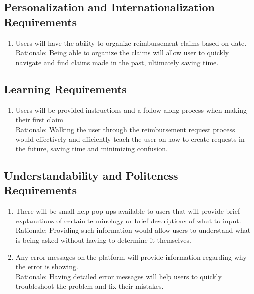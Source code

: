 \documentclass[12pt]{article}
\begin{document}
\subsection{Personalization and Internationalization Requirements}

\begin{enumerate}
  
  \item Users will have the ability to organize reimbursement claims based on date. \\
  Rationale: Being able to organize the claims will allow user to quickly navigate and find claims made in the past, ultimately saving time.
\end{enumerate}
\subsection{Learning Requirements}

\begin{enumerate}
  \item Users will be provided instructions and a follow along process when making their first claim \\
  Rationale: Walking the user through the reimbursement request process would effectively and efficiently teach the user on how to create requests in the future, saving time and minimizing confusion.
  
\end{enumerate}
\subsection{Understandability and Politeness Requirements}

\begin{enumerate}
  
  \item There will be small help pop-ups available to users that will provide brief explanations of certain terminology or brief descriptions of what to input. \\
  Rationale: Providing such information would allow users to understand what is being asked without having to determine it themselves.
  \item Any error messages on the platform will provide information regarding why the error is showing. \\
  Rationale: Having detailed error messages will help users to quickly troubleshoot the problem and fix their mistakes.
\end{enumerate}
\end{document}
